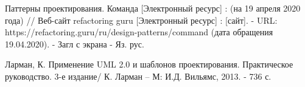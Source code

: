 \documentclass[14pt]{extreport}
\begin{document}
\begin{thebibliography}{9}
  Паттерны проектирования. Команда [Электронный ресурс] : (на 19 апреля 2020 года) // Веб-сайт refactoring guru [Электронный ресурс] : [сайт]. - URL: https://refactoring.guru/ru/design-patterns/command (дата обращения 19.04.2020). - Загл с экрана - Яз. рус.
  
  Ларман, К. Применение UML 2.0 и шаблонов проектирования. Практическое руководство. 3-е издание/ К. Ларман -- М: И.Д. Вильямс, 2013. - 736 с.
\end{thebibliography}


\end{document}
